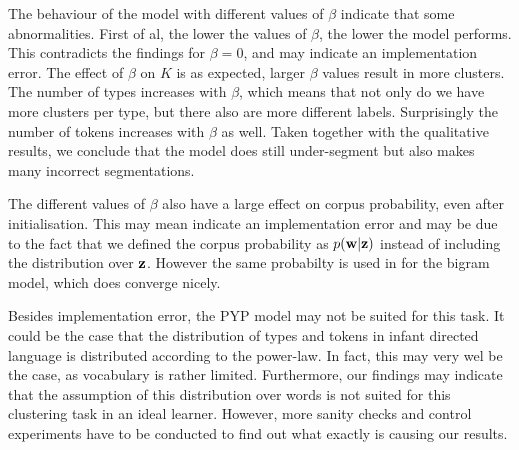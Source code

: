 The behaviour of the model with different values of $\beta$ indicate that some abnormalities. First of al, the lower the values of $\beta$, the lower the model performs. This contradicts the findings for $\beta = 0$, and may indicate an implementation error. The effect of $\beta$ on $K$ is as expected, larger $\beta$ values result in more clusters.
The number of types increases with $\beta$, which means that not only do we have more clusters per type, but there also are more different labels. Surprisingly the number of tokens increases with $\beta$ as well. Taken together with the qualitative results, we conclude that the model does still under-segment but also makes many incorrect segmentations.

The different values of $\beta$ also have a large effect on corpus probability, even after initialisation. This may mean indicate an implementation error and may be due to the fact that we defined the corpus probability as $p(\bm{\mathbf{w}}|\bm{\mathbf{z}})$ instead of including the distribution over $\bm{\mathbf{z}}$. However the same probabilty is used in \cite{Goldwater200921} for the bigram model, which does converge nicely.
 
 Besides implementation error, the PYP model may not be suited for this task. It could be the case that the distribution of types and tokens in infant directed language is distributed according to the power-law. In fact, this may very wel be the case, as vocabulary is rather limited. 
 Furthermore, our findings may indicate that the assumption of this distribution over words is not suited for this clustering task in an ideal learner. However, more sanity checks and control experiments have to be conducted to find out what exactly is causing our results.